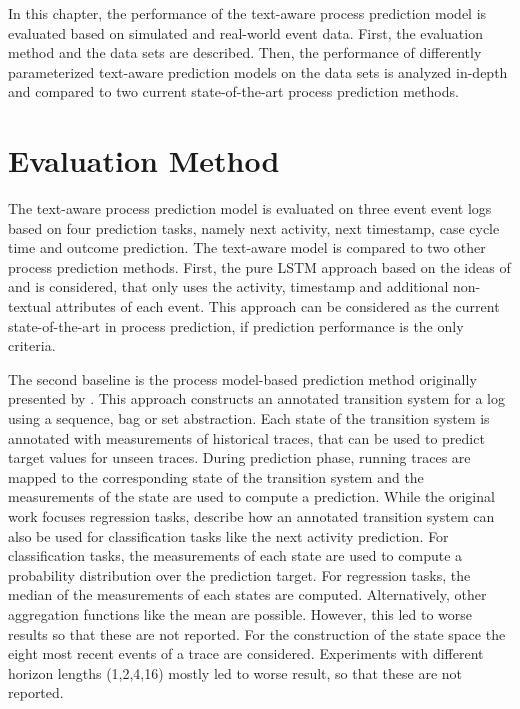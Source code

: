 In this chapter, the performance of the text-aware process prediction model is evaluated based on simulated and real-world event data.
First, the evaluation method and the data sets are described.
Then, the performance of differently parameterized text-aware prediction models on the data sets is analyzed in-depth and compared to two current state-of-the-art process prediction methods.

\section{Evaluation Method}

The text-aware process prediction model is evaluated on three event event logs based on four prediction tasks, namely next activity, next timestamp, case cycle time and outcome prediction.
The text-aware model is compared to two other process prediction methods.
First, the pure LSTM approach based on the ideas of \citeauthor{DBLP:conf/caise/TaxVRD17} \cite{DBLP:conf/caise/TaxVRD17} and \citeauthor{DBLP:conf/ssci/NavarinVPS17} \cite{DBLP:conf/ssci/NavarinVPS17} is considered, that only uses the activity, timestamp and additional non-textual attributes of each event.
This approach can be considered as the current state-of-the-art in process prediction, if prediction performance is the only criteria.

The second baseline is the process model-based prediction method originally presented by \citeauthor{DBLP:journals/is/AalstSS11} \cite{DBLP:journals/is/AalstSS11}.
This approach constructs an annotated transition system for a log using a sequence, bag or set abstraction.
Each state of the transition system is annotated with measurements of historical traces, that can be used to predict target values for unseen traces.
During prediction phase, running traces are mapped to the corresponding state of the transition system and the measurements of the state are used to compute a prediction.
While the original work focuses regression tasks, \citeauthor{DBLP:journals/sosym/TaxTZ20} \cite{DBLP:journals/sosym/TaxTZ20} describe how an annotated transition system can also be used for classification tasks like the next activity prediction.
For classification tasks, the measurements of each state are used to compute a probability distribution over the prediction target.
For regression tasks, the median of the measurements of each states are computed.
Alternatively, other aggregation functions like the mean are possible.
However, this led to worse results so that these are not reported.
For the construction of the state space the eight most recent events of a trace are considered.
Experiments with different horizon lengths (1,2,4,16) mostly led to worse result, so that these are not reported.

